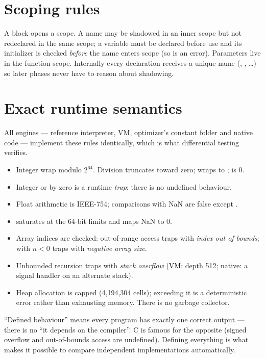 \section{Scoping rules}
A \code{\{ \}} block opens a scope. A name may be shadowed in an inner scope but not redeclared in the same scope; a variable must be declared before use and its initializer is checked \emph{before} the name enters scope (so  is an error). Parameters live in the function scope. Internally every declaration receives a unique name (, , \ldots) so later phases never have to reason about shadowing.

\section{Exact runtime semantics}
All engines --- reference interpreter, VM, optimizer's constant folder and native code --- implement these rules identically, which is what differential testing verifies.

\begin{itemize}
  \item Integer \code{+ - *} wrap modulo $2^{64}$. Division truncates toward zero;  wraps to ;  is 0.
  \item Integer \code{/} or \code{\%} by zero is a runtime \emph{trap}; there is no undefined behaviour.
  \item Float arithmetic is IEEE-754; comparisons with NaN are false except \code{!=}.
  \item {} saturates at the 64-bit limits and maps NaN to 0.
  \item Array indices are checked: out-of-range access traps with \emph{index out of bounds};  with $n<0$ traps with \emph{negative array size}.
  \item Unbounded recursion traps with \emph{stack overflow} (VM: depth 512; native: a signal handler on an alternate stack).
  \item Heap allocation is capped (4{,}194{,}304 cells); exceeding it is a deterministic error rather than exhausting memory. There is no garbage collector.
\end{itemize}

\begin{plain}
``Defined behaviour'' means every program has exactly one correct output --- there is no ``it depends on the compiler''. C is famous for the opposite (signed overflow and out-of-bounds access are undefined). Defining everything is what makes it possible to compare independent implementations automatically.
\end{plain}

